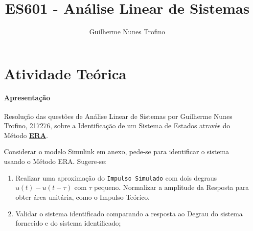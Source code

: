 \documentclass{article}
\title{ES601 - Análise Linear de Sistemas}
\author{Guilherme Nunes Trofino}
\begin{document}
    \maketitle
\newpage

\section{Atividade Teórica}
    \paragraph{Apresentação}Resolução das questões de Análise Linear de Sistemas por Guilherme Nunes Trofino, 217276, sobre a Identificação de um Sistema de Estados através do Método  \href{https://en.wikipedia.org/wiki/Eigensystem_realization_algorithm}{\textbf{ERA}}.
    \begin{exercise}
        Considerar o modelo Simulink em anexo, pede-se para identificar o sistema usando o Método ERA. Sugere-se:
        \begin{enumerate}[rightmargin = \leftmargin]
            \item\label{1} Realizar uma aproximação do \texttt{Impulso Simulado} com dois degraus $u(t) - u(t-\tau)$ com $\tau$ pequeno. Normalizar a amplitude da Resposta para obter área unitária, como o Impulso Teórico.
            \item\label{2} Validar o sistema identificado comparando a resposta ao Degrau do sistema fornecido e do sistema identificado;
        \end{enumerate}
    \end{exercise}
\newpage
\end{document}
